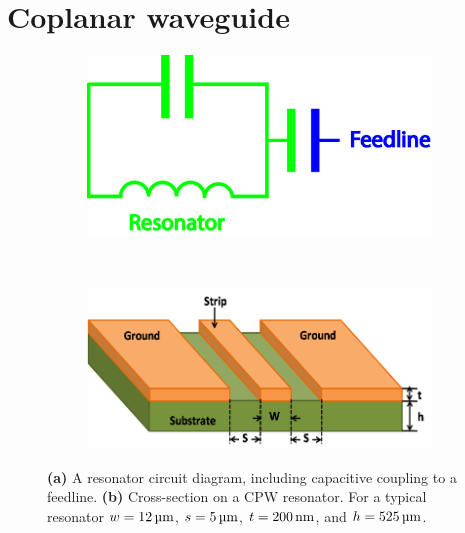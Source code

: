   \section{Coplanar waveguide}
    \captionsetup[subfigure]{position=top}
    \begin{figure}[h]
      \begin{subfigure}{.49\textwidth}
        \begin{center}
            \includegraphics[width=.8\textwidth]{Figures/DRIE/resonator schematic joined.jpg}
        \end{center}
        \caption{ }
        \label{fig:CPW schematic}
      \end{subfigure}
      ~
      \begin{subfigure}{.49\textwidth}
        \begin{center}
            \includegraphics[width=.8\textwidth]{Figures/DRIE/CPW.png}
        \end{center}
        \caption{ }
        \label{fig:CPW intersection}
      \end{subfigure}
      \caption{\textbf{(a)} A resonator circuit diagram, including capacitive coupling to a feedline. \textbf{(b)} Cross-section on a CPW resonator. For a typical resonator $w=\text{\ensuremath{\SI{12}{\micro \meter}}}$, $s=\text{\ensuremath{\SI{5}{\micro \meter}}}$, $t=\text{\ensuremath{\SI{200}{\nano \meter}}}$, and $h=\text{\ensuremath{\SI{525}{\micro \meter}}}$.}
      \label{fig:CPW}
    \end{figure}
    \captionsetup[subfigure]{position=top}

